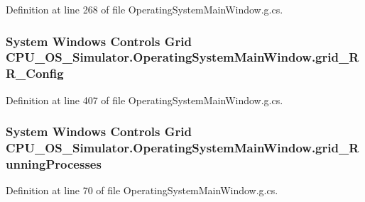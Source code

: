 Definition at line 268 of file Operating\+System\+Main\+Window.\+g.\+cs.

\hypertarget{class_c_p_u___o_s___simulator_1_1_operating_system_main_window_a626ad676e978db5c0d52825764e68ea5}{}
\subsubsection[{grid\+\_\+\+R\+R\+\_\+\+Config}]{\setlength{\rightskip}{0pt plus 5cm}System Windows Controls Grid C\+P\+U\+\_\+\+O\+S\+\_\+\+Simulator.\+Operating\+System\+Main\+Window.\+grid\+\_\+\+R\+R\+\_\+\+Config\hspace{0.3cm}{\ttfamily [package]}}\label{class_c_p_u___o_s___simulator_1_1_operating_system_main_window_a626ad676e978db5c0d52825764e68ea5}


Definition at line 407 of file Operating\+System\+Main\+Window.\+g.\+cs.

\hypertarget{class_c_p_u___o_s___simulator_1_1_operating_system_main_window_a628b5d00213f20c361f776b85b3f7115}{}
\subsubsection[{grid\+\_\+\+Running\+Processes}]{\setlength{\rightskip}{0pt plus 5cm}System Windows Controls Grid C\+P\+U\+\_\+\+O\+S\+\_\+\+Simulator.\+Operating\+System\+Main\+Window.\+grid\+\_\+\+Running\+Processes\hspace{0.3cm}{\ttfamily [package]}}\label{class_c_p_u___o_s___simulator_1_1_operating_system_main_window_a628b5d00213f20c361f776b85b3f7115}


Definition at line 70 of file Operating\+System\+Main\+Window.\+g.\+cs.

